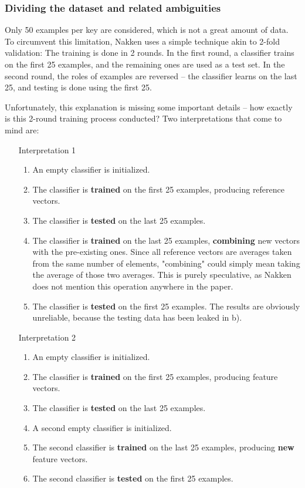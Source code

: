 \documentclass[../main.tex]{subfiles}
\begin{document}
\subsubsection{Dividing the dataset and related ambiguities}
Only 50 examples per key are considered, which is not a great amount of data.
To circumvent this limitation, Nakken uses a simple technique akin to 2-fold
validation: The training is done in 2 rounds. In the first round, a classifier
trains on the first 25 examples, and the remaining ones are used as a test set.
In the second round, the roles of examples are reversed -- the classifier learns
on the last 25, and testing is done using the first 25.

Unfortunately, this explanation is missing some important details -- how
exactly is this 2-round training process conducted? Two interpretations
that come to mind are:
\begin{enumerate}
    \item [Interpretation 1]
    \begin{enumerate}
        \item An empty classifier is initialized.
        \item The classifier is \textbf{trained} on the first 25 examples,
        producing reference vectors.
        \item The classifier is \textbf{tested} on the last 25 examples.
        \item The classifier is \textbf{trained} on the last 25 examples,
        \textbf{combining} new vectors with the pre-existing ones.
        Since all reference vectors are averages taken from the same
        number of elements, "combining" could simply mean taking the
        average of those two averages. This is purely speculative,
        as Nakken does not mention this operation anywhere in the paper.
        \item The classifier is \textbf{tested} on the first 25 examples.
        The results are obviously unreliable, because the testing data has
        been leaked in b).
    \end{enumerate}
    \item [Interpretation 2]
    \begin{enumerate}
        \item An empty classifier is initialized.
        \item The classifier is \textbf{trained} on the first 25 examples,
        producing feature vectors.
        \item The classifier is \textbf{tested} on the last 25 examples.
        \item A second empty classifier is initialized.
        \item The second classifier is \textbf{trained} on the last 25 examples,
        producing \textbf{new} feature vectors.
        \item The second classifier is \textbf{tested} on the first 25 examples.
    \end{enumerate}
\end{enumerate}
\end{document}
